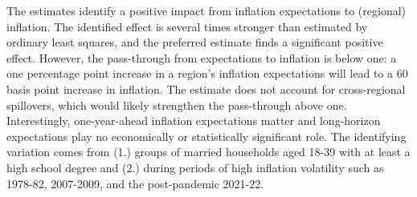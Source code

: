 \documentclass[12pt]{article}
\begin{document}
The estimates identify a positive impact from inflation expectations to (regional) inflation. The identified effect is several times stronger than estimated by ordinary least squares, and the preferred estimate finds a significant positive effect. However, the pass-through from expectations to inflation is below one: a one percentage point increase in a region's inflation expectations will lead to a 60 basis point increase in inflation. The estimate does not account for cross-regional spillovers, which would likely strengthen the pass-through above one. Interestingly, one-year-ahead inflation expectations matter and long-horizon expectations play no economically or statistically significant role. The identifying variation comes from (1.) groups of married households aged 18-39 with at least a high school degree and (2.) during periods of high inflation volatility such as 1978-82, 2007-2009, and the post-pandemic 2021-22.

\pagebreak




%


\end{document}
